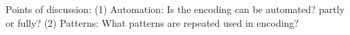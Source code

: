
Points of discussion:
(1) Automation: Is the encoding can be automated? partly or fully? 
(2) Patterns: What patterns are repeated used in encoding?


